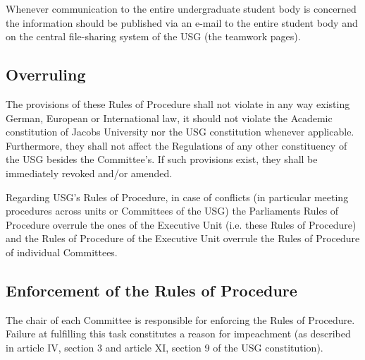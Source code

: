 Whenever communication to the entire undergraduate student body is concerned the information should be published via an e-mail to the entire student body and on the central file-sharing system of the USG (the teamwork pages).

\subsection{Overruling}\label{provision:overruling}
The provisions of these Rules of Procedure shall not violate in any way existing German, European or International law, it should not violate the Academic constitution of Jacobs University nor the USG constitution whenever applicable. Furthermore, they shall not affect the Regulations of any other constituency of the USG besides the Committee's. If such provisions exist, they shall be immediately revoked and/or amended.

Regarding USG's Rules of Procedure, in case of conflicts (in particular meeting procedures across units or Committees of the USG) the Parliaments Rules of Procedure overrule the ones of the Executive Unit (i.e. these Rules of Procedure) and the Rules of Procedure of the Executive Unit overrule the Rules of Procedure of individual Committees. 

\subsection{Enforcement of the Rules of Procedure}
The chair of each Committee is responsible for enforcing the Rules of Procedure. Failure at fulfilling this task constitutes a reason for impeachment (as described in article IV, section 3 and article XI, section 9 of the USG constitution).